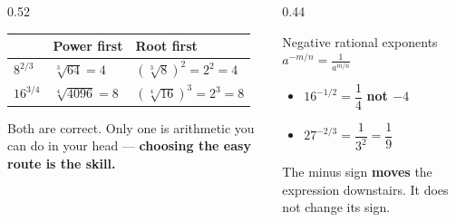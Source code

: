 \documentclass[aspectratio=169, 11pt]{beamer}
\begin{document}
\begin{frame}[t, plain]
  \begin{columns}[T]
    \begin{column}{0.52\textwidth}
      \footnotesize
      \begin{tabular}{lll}
      \hline
       & \textbf{Power first} & \textbf{Root first} \\
      \hline
      $8^{2/3}$ & $\sqrt[3]{64}=4$ & $\left(\sqrt[3]{8}\right)^{2}=2^{2}=4$ \\
      $16^{3/4}$ & $\sqrt[4]{4096}=8$ & $\left(\sqrt[4]{16}\right)^{3}=2^{3}=8$ \\
      \hline
      \end{tabular}
      \vspace{5pt}

      {\footnotesize Both are correct. Only one is arithmetic you can do in your head ---
      \textcolor{goldacc}{\textbf{choosing the easy route is the skill.}}}
    \end{column}
    \begin{column}{0.44\textwidth}
      \begin{block}{Negative rational exponents}
        \centering $\displaystyle a^{-m/n} = \frac{1}{a^{m/n}}$
      \end{block}
      \vspace{2pt}
      \footnotesize
      \begin{itemize}\setlength{\itemsep}{4pt}
        \item $16^{-1/2} = \dfrac{1}{4}$ \quad
              \textcolor{keyred}{\textbf{not $-4$}}
        \item $27^{-2/3} = \dfrac{1}{3^{2}} = \dfrac{1}{9}$
      \end{itemize}
      \vspace{3pt}
      {\footnotesize The minus sign \textbf{moves} the expression downstairs. It does not change its
      sign.}
    \end{column}
  \end{columns}
\end{frame}
\end{document}
